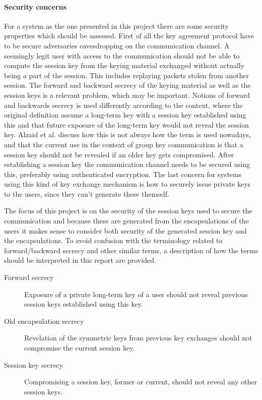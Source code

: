 \paragraph{Security concerns}
For a system as the one presented in this project there are some security properties which should be assessed. First of all the key agreement protocol have to be secure adversaries eavesdropping on the communication channel. A seemingly legit user with access to the communication should not be able to compute the session key from the keying material exchanged without actually being a part of the session. This includes replaying packets stolen from another session. The forward and backward secrecy of the keying material as well as the session keys is a relevant problem, which may be important. Notions of forward and backwards secrecy is used differently according to the context, where the original definition assume a long-term key with a session key established using this and that future exposure of the long-term key would not reveal the session key. Alzaid et al. \cite{Alzaid2010} discuss how this is not always how the term is used nowadays, and that the current use in the context of group key communication is that a session key should not be revealed if an older key gets compromised. After establishing a session key the communication channel needs to be secured using this, preferably using authenticated encryption. The last concern for systems using this kind of key exchange mechanism is how to securely issue private keys to the users, since they can't generate these themself.      


\par The focus of this project is on the security of the session keys used to secure the communication and because these are generated from the encapsulations of the users it makes sense to consider both security of the generated session key and the encapsulations. To avoid confusion with the terminology related to forward/backward secrecy and other similar terms, a description of how the terms should be interpreted in this report are provided.

\begin{description}
\item[Forward secrecy] Exposure of a private long-term key of a user should not reveal previous session keys established using this key. 
\item[Old encapsulation secrecy]Revelation of the symmetric keys from previous key exchanges should not compromise the current session key.
\item[Session key secrecy] Compromising a session key, former or current, should not reveal any other session keys.
\end{description}

